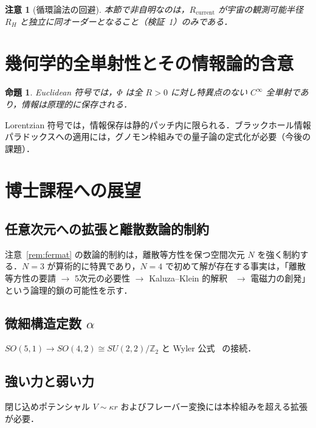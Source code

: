 \documentclass[12pt,a4paper]{ltjsarticle}
\newtheorem{proposition}[theorem]{命題}
\newtheorem*{remark}{注意}
\begin{document}
\begin{remark}[循環論法の回避]
本節で非自明なのは，$R_{\text{current}}$ が宇宙の観測可能半径 $R_H$ と独立に同オーダーとなること（検証~1）のみである．
\end{remark}

\section{幾何学的全単射性とその情報論的含意}

\begin{proposition}
Euclidean 符号では，$\Phi$ は全 $R > 0$ に対し特異点のない $C^\infty$ 全単射であり，情報は原理的に保存される．
\end{proposition}

Lorentzian 符号では，情報保存は静的パッチ内に限られる．ブラックホール情報パラドックスへの適用には，グノモン枠組みでの量子論の定式化が必要（今後の課題）．

\section{博士課程への展望}

\subsection{任意次元への拡張と離散数論的制約}

注意~\ref{rem:fermat} の数論的制約は，離散等方性を保つ空間次元 $N$ を強く制約する．$N = 3$ が算術的に特異であり，$N = 4$ で初めて解が存在する事実は，「離散等方性の要請 $\to$ 5次元の必要性 $\to$ Kaluza--Klein 的解釈~\cite{Kaluza1921,Klein1926} $\to$ 電磁力の創発」という論理的鎖の可能性を示す．

\subsection{微細構造定数 $\alpha$}
$SO(5,1) \to SO(4,2) \cong SU(2,2)/\mathbb{Z}_2$ と Wyler 公式~\cite{Wyler1971} の接続．

\subsection{強い力と弱い力}
閉じ込めポテンシャル $V \sim \kappa r$ およびフレーバー変換には本枠組みを超える拡張が必要．
\end{document}
